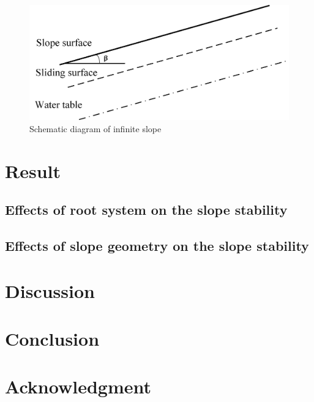 \begin{figure}
\includegraphics[width=1.0\textwidth]{slopemodel.jpg}
\caption{Schematic diagram of infinite slope}
\end{figure} 
\label{fig:sm}





\section{Result}


\subsection{Effects of root system on the slope stability}


\subsection{Effects of slope geometry on the slope stability}


\section{Discussion}


\section{Conclusion}



\section{Acknowledgment}




%

%
%




